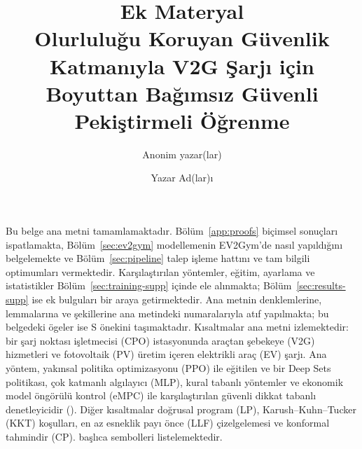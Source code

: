 \IfFileExists{saucis.cls}{\saucistrue\documentclass[final,9pt,onecolumn]{saucis}}{\saucisfalse\documentclass[10pt]{article}}
\title{Ek Materyal\\[1mm]\large Olurluluğu Koruyan Güvenlik Katmanıyla V2G Şarjı için Boyuttan Bağımsız Güvenli Pekiştirmeli Öğrenme}
\author{Anonim yazar(lar)}
\author{Yazar Ad(lar)ı\\ \small \TODO{Kurum(lar)}}
\date{}
\begin{document}
\maketitle

\begin{center}
\end{center}

Bu belge ana metni tamamlamaktadır.
Bölüm~\ref{app:proofs} biçimsel sonuçları ispatlamakta, Bölüm~\ref{sec:ev2gym} modellemenin EV2Gym'de nasıl yapıldığını belgelemekte ve Bölüm~\ref{sec:pipeline} talep işleme hattını ve tam bilgili optimumları vermektedir.
Karşılaştırılan yöntemler, eğitim, ayarlama ve istatistikler Bölüm~\ref{sec:training-supp} içinde ele alınmakta; Bölüm~\ref{sec:results-supp} ise ek bulguları bir araya getirmektedir.
Ana metnin denklemlerine, lemmalarına ve şekillerine ana metindeki numaralarıyla atıf yapılmakta; bu belgedeki ögeler ise S önekini taşımaktadır.
Kısaltmalar ana metni izlemektedir: bir şarj noktası işletmecisi (CPO) istasyonunda araçtan şebekeye (V2G) hizmetleri ve fotovoltaik (PV) üretim içeren elektrikli araç (EV) şarjı.
Ana yöntem, yakınsal politika optimizasyonu (PPO) ile eğitilen ve bir Deep Sets politikası, çok katmanlı algılayıcı (MLP), kural tabanlı yöntemler ve ekonomik model öngörülü kontrol (eMPC) ile karşılaştırılan güvenli dikkat tabanlı denetleyicidir (\method{}).
Diğer kısaltmalar doğrusal program (LP), Karush--Kuhn--Tucker (KKT) koşulları, en az esneklik payı önce (LLF) çizelgelemesi ve konformal tahmindir (CP).
 başlıca sembolleri listelemektedir.








\clearpage
{}

\end{document}

